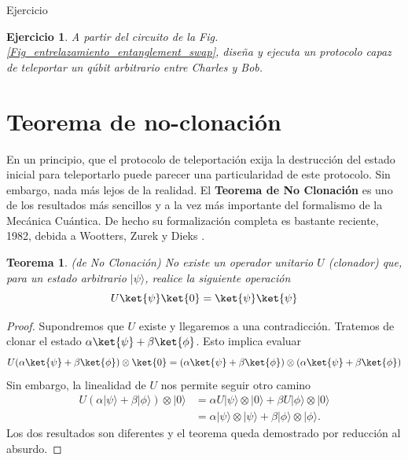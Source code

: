 \documentclass[a4paper,11pt]{book} %
\newtheorem{teorema_contador}{Teorema}
\newcommand{\Teorema}[1]{
		\begin{mybox_gray2}{}
			\begin{teorema_contador}
				 #1 
			\end{teorema_contador} 
		\end{mybox_gray2}
	}
\newtheorem{ejercicio_contador}{Ejercicio}
\newcommand{\Ejercicio}[1]{
		\begin{mybox_gray}{Ejercicio} 
			\begin{ejercicio_contador}
				 #1 
			\end{ejercicio_contador} 
		\end{mybox_gray}
	}
\numberwithin{equation}{chapter}
\begin{document}
	\Ejercicio{
	A partir del circuito de la Fig. \ref{Fig_entrelazamiento_entanglement_swap}, diseña y ejecuta un protocolo capaz de teleportar un qúbit arbitrario entre Charles y Bob.
	}


	\section{Teorema de no-clonación} \label{sec_no_clone}
	
	En un principio, que el protocolo de teleportación exija la destrucción del estado inicial para teleportarlo puede parecer una particularidad de este protocolo. Sin embargo, nada más lejos de la realidad.
	El \textbf{Teorema de No Clonación} es uno de los resultados más sencillos y a la vez más importante del formalismo de la Mecánica Cuántica. De hecho su formalización completa es bastante reciente, 1982, debida a Wootters, Zurek \cite{bib_clone2} y Dieks \cite{bib_clone1}.
	
	\Teorema{ \textit{(de No Clonación)}
	No existe un operador unitario $U$ (clonador) que, para un estado arbitrario $|\psi\rangle$, realice la siguiente operación
		\begin{equation}
		U \ket{\psi}\ket{0} = \ket{\psi}\ket{\psi}
		\end{equation}
	}

	\begin{proof}
	Supondremos que $U$ existe y llegaremos a una contradicción. 
	Tratemos de clonar el estado $\alpha\ket{\psi}+\beta\ket{\phi}$. Esto implica evaluar
		\begin{equation*}
		U (\alpha\ket{\psi}+\beta\ket{\phi})\otimes \ket{0} = 	(\alpha\ket{\psi}+\beta\ket{\phi})\otimes (\alpha\ket{\psi}+\beta\ket{\phi})
		\end{equation*}	
	Sin embargo, la linealidad de $U$ nos permite seguir otro camino
		\begin{align*}
		U(\alpha|\psi\rangle+\beta|\phi\rangle) \otimes|0\rangle 
			& = \alpha U|\psi\rangle \otimes|0\rangle+\beta U|\phi\rangle \otimes|0\rangle  \\
			& = \alpha|\psi\rangle \otimes|\psi\rangle+\beta|\phi\rangle \otimes|\phi\rangle . 
		\end{align*}
	Los dos resultados son diferentes y el teorema queda demostrado por reducción al absurdo.
	\end{proof}
\end{document}
